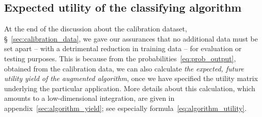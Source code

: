 \documentclass[\ifafour a4paper,12pt,\else a5paper,10pt,\fi%
onecolumn,oneside,article,%
british%
]{memoir}
\theoremstyle{remark}
\theoremstyle{innote}
\renewcommand*{\|}[1][]{\nonscript\:#1\vert\nonscript\:\mathopen{}}
\newcommand*{\sect}{\S}%
\begin{document}
\subsection{Expected utility of the classifying algorithm}
\label{sec:yield_of_classifier}

At the end of the discussion about the calibration dataset, \sect~\ref{sec:calibration_data}, we gave our assurances that no additional data must be set apart -- with a detrimental reduction in training data -- for evaluation or testing purposes. This is because from the probabilities~\eqref{eq:prob_output}, obtained from the calibration data, we can also calculate \emph{the expected, future utility yield of the augmented algorithm}, once we have specified the utility matrix underlying the particular application. More details about this calculation, which amounts to a low-dimensional integration, are given in appendix~\ref{sec:algorithm_yield}; see especially formula~\eqref{eq:algorithm_utility}.
\end{document}
